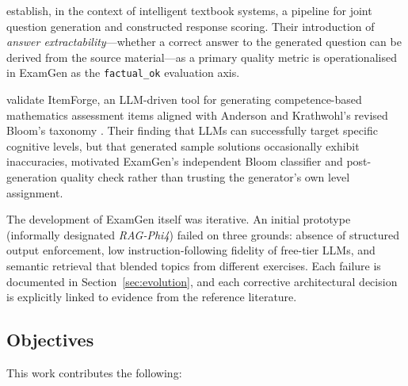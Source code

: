\documentclass[12pt, a4paper]{article}
\begin{document}
\citet{morris2024aqg} establish, in the context of intelligent textbook systems,
a pipeline for joint question generation and constructed response scoring. Their
introduction of \textit{answer extractability}---whether a correct answer to the
generated question can be derived from the source material---as a primary quality
metric is operationalised in ExamGen as the \texttt{factual\_ok} evaluation axis.

\citet{meissner2024itemforge} validate ItemForge, an LLM-driven tool for generating
competence-based mathematics assessment items aligned with Anderson and Krathwohl's
revised Bloom's taxonomy \cite{bloom2001}. Their finding that LLMs can successfully
target specific cognitive levels, but that generated sample solutions occasionally
exhibit inaccuracies, motivated ExamGen's independent Bloom classifier and
post-generation quality check rather than trusting the generator's own level
assignment.

The development of ExamGen itself was iterative. An initial prototype (informally
designated \textit{RAG-Phi4}) failed on three grounds: absence of structured output
enforcement, low instruction-following fidelity of free-tier LLMs, and semantic
retrieval that blended topics from different exercises. Each failure is documented
in Section~\ref{sec:evolution}, and each corrective architectural decision is
explicitly linked to evidence from the reference literature.

\subsection{Objectives}

This work contributes the following:
\end{document}
